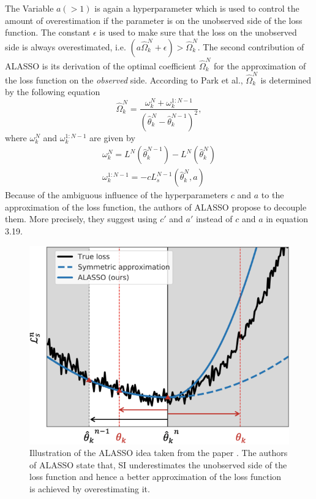 The Variable $a (>1)$ is again a hyperparameter which is used to control the amount of overestimation if the parameter is on the unobserved side of the loss function.
The constant $\epsilon$ is used to make sure that the loss on the unobserved side is always overestimated, i.e. $(a \hat{\Omega}^N_k + \epsilon) > \hat{\Omega}^N_k$.
The second contribution of ALASSO is its derivation of the optimal coefficient $\hat{\Omega}^N_k$ for the approximation of the loss function on the \textit{observed}
side. According to Park et al., $\hat{\Omega}^N_k$ is determined by the following equation
\begin{equation}
    \hat{\Omega}^N_k = \frac{\omega^N_k + \omega^{1:N-1}_k}{(\hat{\theta}^N_k - \hat{\theta}^{N-1}_k)^2},
\end{equation}
where $\omega^N_k$ and $\omega^{1:N-1}_k$ are given by
\begin{gather}
    \omega^N_k = L^N(\hat{\theta}^{N-1}_k) - L^N(\hat{\theta}^N_k) \\
    \omega^{1:N-1}_k = -cL^{N-1}_s(\hat{\theta}^N_k,a)
\end{gather}
Because of the ambiguous influence of the hyperparameters $c$ and $a$ to the approximation of the loss function, the authors of ALASSO propose to decouple them. More
precisely, they suggest using $c'$ and $a'$ instead of $c$ and $a$ in equation 3.19.

\begin{figure} [ht]
    \centering
    \includegraphics[width=.9\linewidth]{images/Alasso_Idea.png}
    \caption[Visualization of ALASSO]{Illustration of the ALASSO idea taken from the paper \cite{park2019continual}. The authors of ALASSO state that, SI underestimates the 
    unobserved side of the loss function and hence a better approximation of the loss function is achieved by overestimating it.}
    \label{fig:Alasso}
\end{figure}


